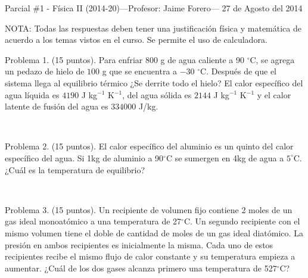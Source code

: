 \documentclass{article}
\begin{document}
\pagestyle{empty}
\noindent

\noindent
{\sc Parcial \#1  - Física II (2014-20)---Profesor: Jaime Forero--- 27
de Agosto del 2014}

NOTA: Todas las respuestas deben tener una justificaci\'on f\'isica y
matem\'atica de acuerdo a los temas vistos en el curso. Se permite el
uso de calculadora.






  Problema 1. (15 puntos). Para enfriar $800$ g de agua caliente a 90 $^\circ$C,
  se agrega un pedazo de hielo de $100$ g que se encuentra a $-30$
  $^{\circ}$C. Despu\'es de que el sistema llega al equilibrio
  t\'ermico ¿Se derrite todo el hielo? El calor espec\'ifico
  del agua l\'iquida es $4190$ J kg$^{-1}$ K$^{-1}$, del agua
  s\'olida es $2144$ J kg$^{-1}$ K$^{-1}$ y el calor latente de
  fusi\'on del agua es $334000$ J/kg. 

\

Problema 2. (15 puntos). El calor espec\'ifico del aluminio es un quinto del calor espec\'ifico
del agua. Si 1kg de aluminio a 90$^\circ$C se sumergen en 4kg de agua
a $5^\circ$C. ¿Cu\'al es la temperatura de equilibrio?  

\



Problema 3. (15 puntos). 
Un recipiente de volumen fijo contiene 2 moles de un gas ideal
monoat\'omico a una temperatura de 27$^{\circ}$C. Un segundo
recipiente con el mismo volumen tiene el doble de cantidad de moles de
un gas ideal diat\'omico. La presi\'on en ambos recipientes es
inicialmente la misma. Cada uno de estos recipientes recibe el mismo
flujo de calor constante y su temperatura empieza a aumentar. ¿Cu\'al
de los dos gases alcanza primero una temperatura de 527$^{\circ}$C?     
\end{document}
